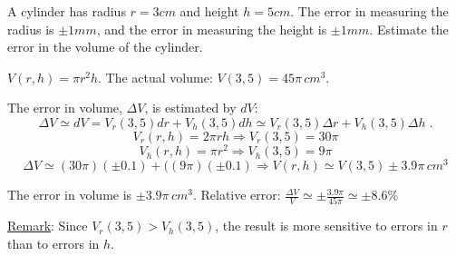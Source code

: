 \begin{frame}
\begin{example}
  A cylinder has radius $r=3cm$ and height $h=5cm$. The error in measuring the radius is $\pm 1 mm$, and the error in measuring the height is $\pm 1 mm$. Estimate the error in the volume of the cylinder.
\pause

$V(r,h) = \pi r^2 h$. The actual volume: $V(3,5) = 45\pi \, cm^3$.

\pause
The error in volume, $\Delta V$, is estimated by $dV$:
%
$$\Delta V \simeq dV = V _r(3,5) dr + V_h(3,5) dh \simeq V _r(3,5) \Delta r + V_h(3,5) \Delta h\; .$$
%
$$V_r(r,h) = 2\pi r h \Longrightarrow V_r(3,5) = 30 \pi$$
%
$$V_h(r,h) = \pi r^2 \Longrightarrow V_h(3,5) = 9\pi$$
%
$$\Delta V  \simeq (30\pi) (\pm 0.1) + ((9\pi)(\pm 0.1) \Longrightarrow V(r,h) \simeq V(3,5) \pm 3.9\pi \, cm^3$$

The error in volume is $\pm 3.9\pi \, cm^3$. \pause
Relative error:
$\frac{\Delta V}{V} \simeq \pm \frac{3.9 \pi}{45\pi} \simeq \pm 8.6\%$

\pause
\underline{Remark}: Since $V_r(3,5) > V_h(3,5)$, the result is more sensitive to errors in $r$ than to errors in $h$.
\end{example}
\end{frame}
